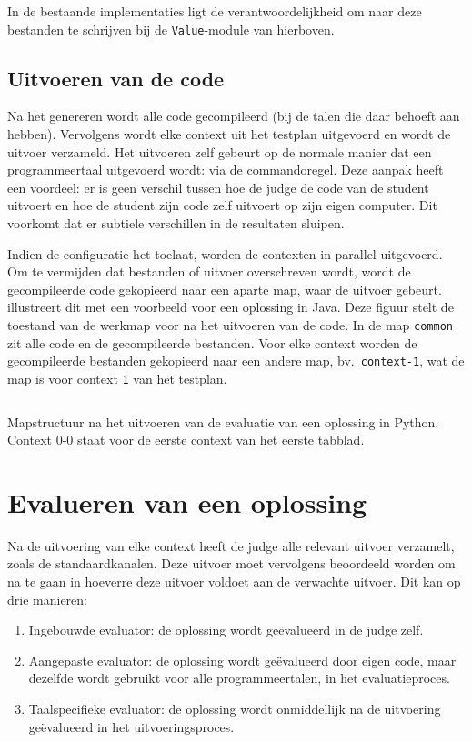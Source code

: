 In de bestaande implementaties ligt de verantwoordelijkheid om naar deze bestanden te schrijven bij de \texttt{Value}-module van hierboven.

\subsection{Uitvoeren van de code}\label{subsec:uitvoeren-van-de-code}

Na het genereren wordt alle code gecompileerd (bij de talen die daar behoeft aan hebben).
Vervolgens wordt elke context uit het testplan uitgevoerd en wordt de uitvoer verzameld.
Het uitvoeren zelf gebeurt op de normale manier dat een programmeertaal uitgevoerd wordt: via de commandoregel.
Deze aanpak heeft een voordeel: er is geen verschil tussen hoe de judge de code van de student uitvoert en hoe de student zijn code zelf uitvoert op zijn eigen computer.
Dit voorkomt dat er subtiele verschillen in de resultaten sluipen.

Indien de configuratie het toelaat, worden de contexten in parallel uitgevoerd.
Om te vermijden dat bestanden of uitvoer overschreven wordt, wordt de gecompileerde code gekopieerd naar een aparte map, waar de uitvoer gebeurt.
 illustreert dit met een voorbeeld voor een oplossing in Java.
Deze figuur stelt de toestand van de werkmap voor na het uitvoeren van de code.
In de map \texttt{common} zit alle code en de gecompileerde bestanden.
Voor elke context worden de gecompileerde bestanden gekopieerd naar een andere map, bv.\ \texttt{context-1}, wat de map is voor context \texttt{1} van het testplan.

\begin{listing}
    \inputminted{text}{code/dir-listing.txt}
    \caption{Mapstructuur na het uitvoeren van de evaluatie van een oplossing in Python.
    Context 0-0 staat voor de eerste context van het eerste tabblad.}
    \label{lst:mapstructuur}
\end{listing}

\section{Evalueren van een oplossing}\label{sec:evalueren-van-een-oplossing2}

Na de uitvoering van elke context heeft de judge alle relevant uitvoer verzamelt, zoals de standaardkanalen.
Deze uitvoer moet vervolgens beoordeeld worden om na te gaan in hoeverre deze uitvoer voldoet aan de verwachte uitvoer.
Dit kan op drie manieren:
\begin{enumerate}
    \item Ingebouwde evaluator: de oplossing wordt geëvalueerd in de judge zelf.
    \item Aangepaste evaluator: de oplossing wordt geëvalueerd door eigen code, maar dezelfde wordt gebruikt voor alle programmeertalen, in het evaluatieproces.
    \item Taalspecifieke evaluator: de oplossing wordt onmiddellijk na de uitvoering geëvalueerd in het uitvoeringsproces.
\end{enumerate}

